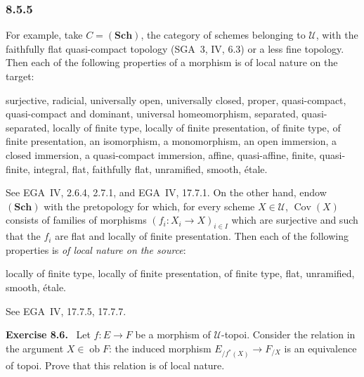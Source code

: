 \documentclass[11pt]{article}
\newcommand{\U}{\mathcal{U}}
\newcommand{\Cov}{\operatorname{Cov}}
\newenvironment{remarktext}[1]{\par\medskip\noindent\textbf{#1.}\ }{\par\medskip}
\providecommand{\ob}{\operatorname{ob}}
\providecommand{\Sch}{\mathbf{Sch}}
\providecommand{\Cov}{\operatorname{Cov}}
\providecommand{\EGA}{EGA}
\providecommand{\SGA}{SGA}
\begin{document}
\subsubsection*{8.5.5}
For example, take \(C=(\Sch)\), the category of schemes belonging to \(\U\), with the faithfully flat quasi-compact topology (\SGA~3, IV, 6.3) or a less fine topology. Then each of the following properties of a morphism is of local nature on the target:
\begin{center}
\begin{minipage}{0.93\linewidth}
surjective, radicial, universally open, universally closed, proper, quasi-compact, quasi-compact and dominant, universal homeomorphism, separated, quasi-separated, locally of finite type, locally of finite presentation, of finite type, of finite presentation, an isomorphism, a monomorphism, an open immersion, a closed immersion, a quasi-compact immersion, affine, quasi-affine, finite, quasi-finite, integral, flat, faithfully flat, unramified, smooth, \'{e}tale.
\end{minipage}
\end{center}
See \EGA~IV, 2.6.4, 2.7.1, and \EGA~IV, 17.7.1. On the other hand, endow \((\Sch)\) with the pretopology for which, for every scheme \(X\in\U\), \(\Cov(X)\) consists of families of morphisms \((f_i:X_i\to X)_{i\in I}\) which are surjective and such that the \(f_i\) are flat and locally of finite presentation. Then each of the following properties is \emph{of local nature on the source}:
\begin{center}
locally of finite type, locally of finite presentation, of finite type, flat, unramified, smooth, \'{e}tale.
\end{center}
See \EGA~IV, 17.7.5, 17.7.7.

\begin{remarktext}{Exercise 8.6}
Let \(f:E\to F\) be a morphism of \(\U\)-topoi. Consider the relation in the argument \(X\in\ob F\): the induced morphism \(E_{/f^*(X)}\to F_{/X}\) is an equivalence of topoi. Prove that this relation is of local nature.
\end{remarktext}
\end{document}
